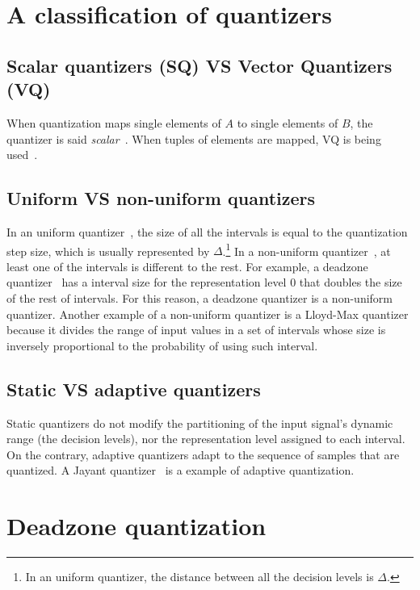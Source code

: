 \section{A classification of quantizers}

\subsection{Scalar quantizers (SQ) VS Vector Quantizers (VQ)}

When quantization maps single elements of $A$ to single elements of
$B$, the quantizer is said
\emph{scalar}~\cite{vruiz__scalar_quantization}. When tuples of
elements are mapped, VQ is being
used~\cite{vruiz__vector_quantization}.

\subsection{Uniform VS non-uniform quantizers}

In an uniform quantizer~\cite{vruiz__scalar_quantization}, the size of
all the intervals is equal to the quantization step size, which is
usually represented by $\Delta$.\footnote{In an uniform quantizer, the
distance between all the decision levels is $\Delta$.} In a
non-uniform quantizer~\cite{vruiz__scalar_quantization}, at least one
of the intervals is different to the rest. For example, a deadzone
quantizer~\cite{vruiz__scalar_quantization} has a interval size for
the representation level 0 that doubles the size of the rest of
intervals. For this reason, a deadzone quantizer is a non-uniform
quantizer. Another example of a non-uniform quantizer is a Lloyd-Max
quantizer because it divides the range of input values in a set of
intervals whose size is inversely proportional to the probability of
using such interval.

\subsection{Static VS adaptive quantizers}

Static quantizers do not modify the partitioning of the input signal's
dynamic range (the decision levels), nor the representation level
assigned to each interval. On the contrary, adaptive quantizers adapt
to the sequence of samples that are quantized. A Jayant
quantizer~\cite{vruiz__scalar_quantization} is a example of adaptive
quantization.

\section{Deadzone quantization}

